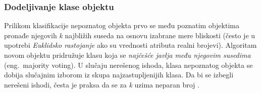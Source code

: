 \documentclass[12pt,oneside]{memoir}
\begin{document}







\subsubsection{Dodeljivanje klase objektu}
Prilikom klasifikacije nepoznatog objekta prvo se među poznatim objektima pronađe njegovih \textit{k} najbližih suseda na osnovu izabrane mere bliskosti (često je u upotrebi \textit{Euklidsko rastojanje} ako su vrednosti atributa realni brojevi). %
Algoritam novom objektu pridružuje klasu koja se \textit{najčešće javlja među njegovim susedima} (eng.~majority voting). U slučaju nerešenog ishoda, klasa nepoznatog objekta se dobija slučajnim izborom iz skupa najzastupljenijih klasa. Da bi se izbegli nerešeni ishodi, česta je praksa da se za \textit{k} uzima neparan broj \cite{mitic, mladen, mlm}.%
\par
\end{document}
